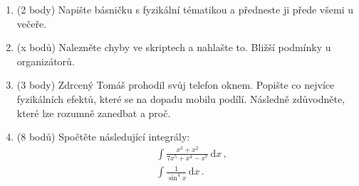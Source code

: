 \documentclass[a4paper, 12pt]{article}
\begin{document}
\begin{enumerate}[label=\arabic*)]
     \item (2 body) Napište básničku s fyzikální tématikou a předneste ji přede všemi u večeře.
     
     \item (x bodů) Nalezněte chyby ve skriptech a nahlašte to. Bližší podmínky u organizátorů.
     
     \item (3 body) Zdrcený Tomáš prohodil svůj telefon oknem. Popište co nejvíce fyzikálních efektů, které se na dopadu mobilu podílí. Následně zdůvodněte, které lze rozumně zanedbat a proč.

     \item (8 bodů) Spočtěte následující integrály:
     \begin{subequations}
     \begin{align*}
         & \int \frac{x^3 + x^2}{7x^5+x^4-x^7}\,\mathrm{d}x \,,\\
         & \int \frac{1}{\sin^4 x}\,\mathrm{d}x \, .
     \end{align*}
     \end{subequations}
\end{enumerate}
\end{document}
